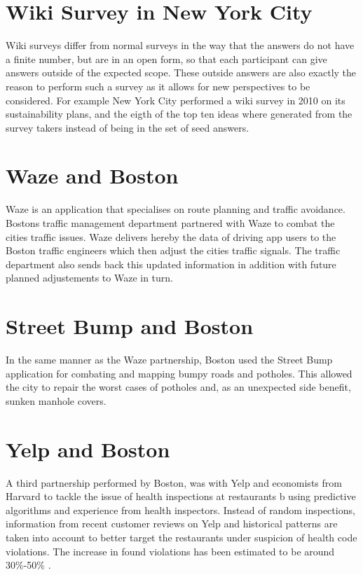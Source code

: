 \documentclass[a4paper,12pt]{report}
\begin{document}
	\section[Wiki Survey in New York City]{Wiki Survey in New York City \cite{BitbyBit}}
	\startsection
		Wiki surveys differ from normal surveys in the way that the answers do not have a finite number, but are in an open form, so that each participant can give answers outside of the expected scope. These outside answers are also exactly the reason to perform such a survey as it allows for new perspectives to be considered. For example New York City performed a wiki survey in 2010 on its sustainability plans, and the eigth of the top ten ideas where generated from the survey takers instead of being in the set of seed answers.
	\closesection

	\section[Waze and Boston]{Waze and Boston \cite{InformationSuperhighway}}
	\startsection
		Waze is an application that specialises on route planning and traffic avoidance.
	Bostons traffic management department partnered with Waze to combat the cities traffic issues. Waze delivers hereby the data of driving app users to the Boston traffic engineers which then adjust the cities traffic signals. The traffic department also sends back this updated information in addition with future planned adjustements to Waze in turn.
	\closesection

	\section[Street Bump and Boston]{Street Bump and Boston \cite{EGG17}}
	\startsection
		In the same manner as the Waze partnership, Boston used the Street Bump application for combating and mapping bumpy roads and potholes. This allowed the city to repair the worst cases of potholes and, as an unexpected side benefit, sunken manhole covers.
	\closesection
	
	\section[Yelp and Boston]{Yelp and Boston \cite{YelpBoston}}
	\startsection
		A third partnership performed by Boston, was with Yelp and economists from Harvard to tackle the issue of health inspections at restaurants b using predictive algorithms and experience from health inspectors.
		Instead of random inspections, information from recent customer reviews on Yelp and historical patterns are taken into account to better target the restaurants under suspicion of health code violations. The increase in found violations has been estimated to be around 30\%-50\% \cite{BSL16} \cite{Gla16}.
	\closesection	
	
\end{document}
